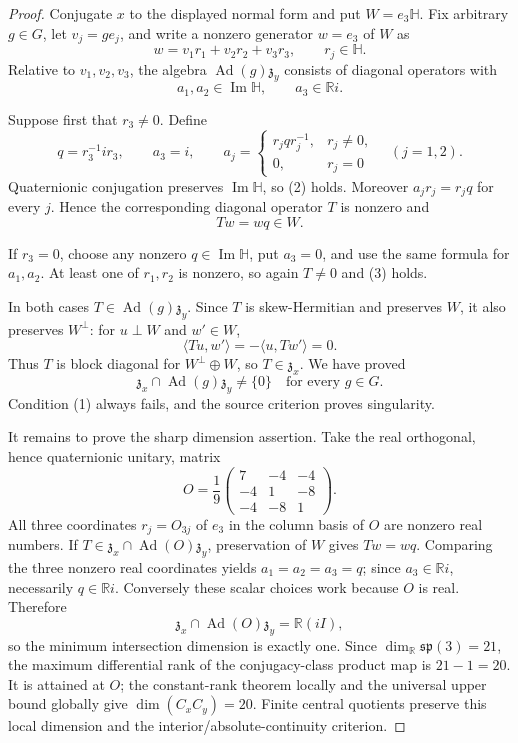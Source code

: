 \documentclass[11pt]{article}
\newcommand{\HH}{\mathbb H}
\newcommand{\spalg}{\mathfrak{sp}}
\newcommand{\zz}{\mathfrak z}
\begin{document}
\begin{proof}
Conjugate \(x\) to the displayed normal form and put
\(W=e_3\HH\). Fix arbitrary \(g\in G\), let \(v_j=ge_j\), and write a
nonzero generator \(w=e_3\) of \(W\) as
\[
                   w=v_1r_1+v_2r_2+v_3r_3,
                   \qquad r_j\in\HH .
\]
Relative to \(v_1,v_2,v_3\), the algebra
\(\operatorname{Ad}(g)\zz_y\) consists of diagonal operators with
\[
 a_1,a_2\in\operatorname{Im}\HH,\qquad a_3\in\mathbb Ri.  \tag{2}
\]

Suppose first that \(r_3\ne0\). Define
\[
 q=r_3^{-1}ir_3,\qquad a_3=i,\qquad
 a_j=
 \begin{cases}
   r_jqr_j^{-1},&r_j\ne0,\\
   0,&r_j=0
 \end{cases}
 \quad(j=1,2).
\]
Quaternionic conjugation preserves \(\operatorname{Im}\HH\), so (2) holds.
Moreover \(a_jr_j=r_jq\) for every \(j\). Hence the corresponding
diagonal operator \(T\) is nonzero and
\[
                         Tw=wq\in W.                       \tag{3}
\]

If \(r_3=0\), choose any nonzero \(q\in\operatorname{Im}\HH\), put
\(a_3=0\), and use the same formula for \(a_1,a_2\). At least one of
\(r_1,r_2\) is nonzero, so again \(T\ne0\) and (3) holds.

In both cases \(T\in\operatorname{Ad}(g)\zz_y\). Since \(T\) is
skew-Hermitian and preserves \(W\), it also preserves \(W^\perp\):
for \(u\perp W\) and \(w'\in W\),
\[
                   \langle Tu,w'\rangle
                   =-\langle u,Tw'\rangle=0.
\]
Thus \(T\) is block diagonal for \(W^\perp\oplus W\), so
\(T\in\zz_x\). We have proved
\[
 \zz_x\cap\operatorname{Ad}(g)\zz_y\ne\{0\}
 \quad\text{for every }g\in G.
\]
Condition (1) always fails, and the source criterion proves singularity.

It remains to prove the sharp dimension assertion. Take the real
orthogonal, hence quaternionic unitary, matrix
\[
 O=\frac1{9}
 \begin{pmatrix}
  7&-4&-4\\
 -4& 1&-8\\
 -4&-8& 1
 \end{pmatrix}.
\]
All three coordinates \(r_j=O_{3j}\) of \(e_3\) in the column basis of
\(O\) are nonzero real numbers. If
\(T\in\zz_x\cap\operatorname{Ad}(O)\zz_y\), preservation of \(W\) gives
\(Tw=wq\). Comparing the three nonzero real coordinates yields
\(a_1=a_2=a_3=q\); since \(a_3\in\mathbb Ri\), necessarily
\(q\in\mathbb Ri\). Conversely these scalar choices work because \(O\)
is real. Therefore
\[
       \zz_x\cap\operatorname{Ad}(O)\zz_y=\mathbb R(iI),
\]
so the minimum intersection dimension is exactly one.
Since \(\dim_{\mathbb R}\spalg(3)=21\), the maximum differential rank of
the conjugacy-class product map is \(21-1=20\). It is attained at \(O\);
the constant-rank theorem locally and the universal upper bound globally
give \(\dim(C_xC_y)=20\). Finite central quotients preserve this local
dimension and the interior/absolute-continuity criterion.
\end{proof}
\end{document}
